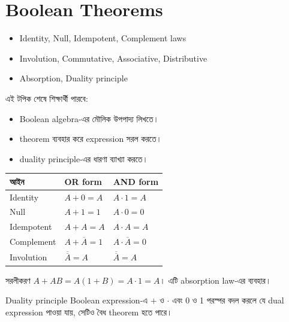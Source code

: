 \section{Boolean Theorems}

\begin{itemize}
\item Identity, Null, Idempotent, Complement laws
\item Involution, Commutative, Associative, Distributive
\item Absorption, Duality principle
\end{itemize}

\begin{learningbox}
এই টপিক শেষে শিক্ষার্থী পারবে:
\begin{itemize}
\item Boolean algebra-এর মৌলিক উপপাদ্য লিখতে।
\item theorem ব্যবহার করে expression সরল করতে।
\item duality principle-এর ধারণা ব্যাখ্যা করতে।
\end{itemize}
\end{learningbox}

\begin{center}
\begin{tabular}{|p{}|p{}|p{}|}
\hline
\textbf{আইন} & \textbf{OR form} & \textbf{AND form} \\
\hline
Identity & $A+0=A$ & $A\cdot1=A$ \\
\hline
Null & $A+1=1$ & $A\cdot0=0$ \\
\hline
Idempotent & $A+A=A$ & $A\cdot A=A$ \\
\hline
Complement & $A+\overline{A}=1$ & $A\cdot\overline{A}=0$ \\
\hline
Involution & $\overline{\overline{A}}=A$ & $\overline{\overline{A}}=A$ \\
\hline
\end{tabular}
\end{center}

\begin{examplebox}{সরলীকরণ}
$A+AB=A(1+B)=A\cdot1=A$। এটি absorption law-এর ব্যবহার।
\end{examplebox}

\begin{keypointbox}{Duality principle}
Boolean expression-এ $+$ ও $\cdot$ এবং 0 ও 1 পরস্পর বদল করলে যে dual expression পাওয়া যায়, সেটিও বৈধ theorem হতে পারে।
\end{keypointbox}
